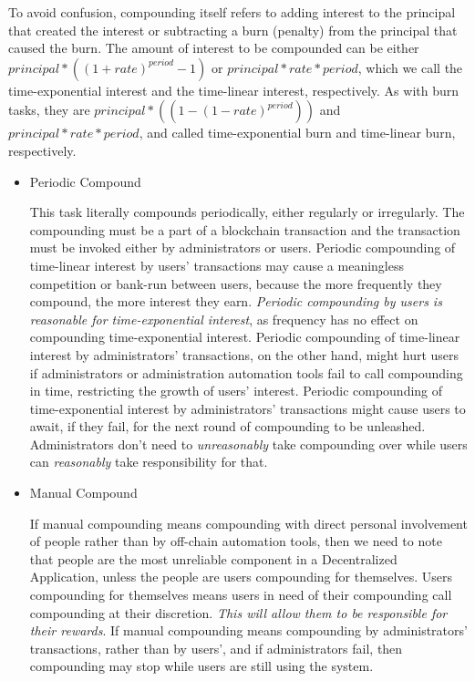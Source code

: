 \documentclass{article}
\begin{document}
To avoid confusion, compounding itself refers to adding interest to the principal that 
created the interest or subtracting a burn (penalty) from the principal that caused 
the burn.
The amount of interest to be compounded can be either 
$principal * ((1+rate)^{period}-1)$ or $principal * rate * period$, which we call 
the time-exponential interest and the time-linear interest, respectively. 
As with burn tasks, they are 
$principal * ((1-(1-rate)^{period}))$ and $principal * rate * period$,
and called time-exponential burn and time-linear burn, respectively.

\begin{itemize}
  \item Periodic Compound

  This task literally compounds periodically, either regularly or irregularly. 
  The compounding must be a part of a blockchain 
  transaction and the transaction must be invoked either by administrators or 
  users. 
  Periodic compounding of time-linear interest by users' transactions 
  may cause a meaningless competition or bank-run between users, because 
  the more frequently they compound, the more interest they earn.
  \textit{Periodic compounding by users is reasonable for time-exponential 
  interest}, as frequency has no effect on compounding time-exponential interest.
  Periodic compounding of time-linear interest by administrators' transactions,
  on the other hand,  
  might hurt users if administrators or administration automation tools fail 
  to call compounding in time, restricting the growth of users' interest.
  Periodic compounding of time-exponential interest by administrators' transactions 
  might cause users to await, if they fail, for the next round of compounding to 
  be unleashed. Administrators don't need to \textit{unreasonably} take compounding 
  over while users can \textit{reasonably} take responsibility for that.
  
  \item Manual Compound

  If manual compounding means compounding with direct personal involvement 
  of people rather than by off-chain automation tools, then we need to note 
  that people are the most unreliable component in a Decentralized Application, 
  unless the people are users compounding for themselves. 
  Users compounding for themselves means users in need of their compounding 
  call compounding at their discretion. \textit{This will allow them to be 
  responsible for their rewards}. 
  If manual compounding means compounding by administrators' transactions,
  rather than by users', and if administrators fail, then compounding may stop 
  while users are still using the system.
  

\end{itemize}
\end{document}
